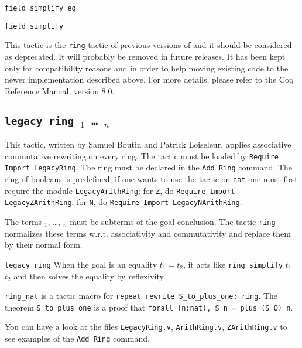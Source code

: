 {\tt field_simplify_eq}

{\tt field_simplify}



\Warning This tactic is the {\tt ring} tactic of previous versions of
\Coq{} and it should be considered as deprecated. It will probably be
removed in future releases. It has been kept only for compatibility
reasons and in order to help moving existing code to the newer
implementation described above. For more details, please refer to the
Coq Reference Manual, version 8.0.


\subsection{\tt legacy ring \term$_1$ \dots\ \term$_n$
}

This tactic, written by Samuel Boutin and Patrick Loiseleur, applies
associative commutative rewriting on every ring.  The tactic must be
loaded by \texttt{Require Import LegacyRing}. The ring must be declared in
the \texttt{Add Ring} command. The ring of booleans
is predefined; if one wants to use the tactic on \texttt{nat} one must
first require the module \texttt{LegacyArithRing}; for \texttt{Z}, do
\texttt{Require Import LegacyZArithRing}; for \texttt{N}, do \texttt{Require
Import LegacyNArithRing}.

The terms \term$_1$, \dots, \term$_n$ must be subterms of the goal
conclusion. The tactic \texttt{ring} normalizes these terms
w.r.t. associativity and commutativity and replace them by their
normal form.

\begin{Variants}
\item \texttt{legacy ring} When the goal is an equality $t_1=t_2$, it
  acts like \texttt{ring\_simplify} $t_1$ $t_2$ and then
  solves the equality by reflexivity.

\item \texttt{ring\_nat} is a tactic macro for \texttt{repeat rewrite
    S\_to\_plus\_one; ring}. The theorem \texttt{S\_to\_plus\_one} is a
  proof that \texttt{forall (n:nat), S n = plus (S O) n}.

\end{Variants}

You can have a look at the files \texttt{LegacyRing.v},
\texttt{ArithRing.v}, \texttt{ZArithRing.v} to see examples of the
\texttt{Add Ring} command.

